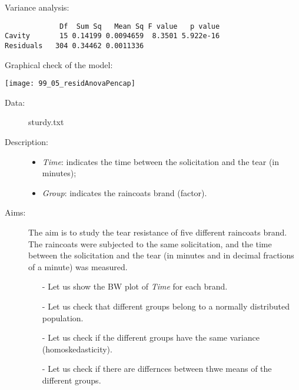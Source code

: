 \begin{frame}[fragile]
  \vspace{0.25cm}
  Variance analysis:
  \begin{verbatim}
             Df  Sum Sq   Mean Sq F value   p value    
Cavity       15 0.14199 0.0094659  8.3501 5.922e-16
Residuals   304 0.34462 0.0011336    
  \end{verbatim}
\end{frame}

\begin{frame}
  Graphical check of the model:\\
  \vspace{.1cm}
  \begin{center}
    \texttt{[image: 99\_05\_residAnovaPencap]}
    \end{center}
\end{frame}


\begin{frame}
  \begin{description}
    \item[Data: ]sturdy.txt \\ 
    \item[Description: ]
      \begin{footnotesize}
        \begin{itemize}
          \item \textit{Time}: indicates the time between the solicitation and the tear (in minutes);
          \item \textit{Group}: indicates the raincoats brand (factor).
        \end{itemize}
      \end{footnotesize}
    \item[Aims: ]
      \begin{footnotesize}
        The aim is to study the tear resistance of five different raincoats brand. The raincoats were subjected to the same solicitation, and the time between the solicitation and the tear (in minutes and in decimal fractions of a minute) was measured.   
        \begin{itemize}
          \item[-] Let us show the BW plot of \textit{Time} for each brand.
          \item[-] Let us check that different groups belong to a normally distributed population.
          \item[-] Let us check if the different groups have the same variance (homoskedasticity).
          \item[-] Let us check if there are differnces between thwe means of the different groups.
        \end{itemize}
      \end{footnotesize}
  \end{description}
\end{frame}

